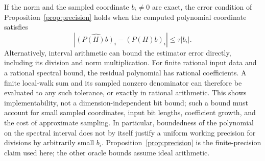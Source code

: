 If the norm and the sampled coordinate $b_i\ne0$ are exact, the error
condition of Proposition~\ref{prop:precision} holds when the computed
polynomial coordinate satisfies
\[
 |\widehat{(P(H)b)_i}-(P(H)b)_i|\leq\tau|b_i|.
\]
Alternatively, interval arithmetic can bound the estimator error
directly, including its division and norm multiplication. For finite rational input data and a rational spectral bound, the
residual polynomial has rational coefficients. A finite local-walk sum
and its sampled nonzero denominator can therefore be evaluated to any
such tolerance, or exactly in rational arithmetic.
This shows implementability, not a dimension-independent bit bound;
such a bound must account for small sampled coordinates, input bit
lengths, coefficient growth, and the cost of approximate sampling.
In particular, boundedness of the polynomial on the spectral interval
does not by itself justify a uniform working precision for divisions by
arbitrarily small $b_i$. Proposition~\ref{prop:precision} is the
finite-precision claim used here; the other oracle bounds assume ideal
arithmetic.
